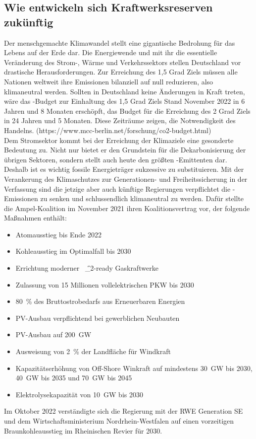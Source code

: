 	\subsection{Wie entwickeln sich Kraftwerksreserven zukünftig}	
	Der menschgemachte Klimawandel stellt eine gigantische Bedrohung für das Lebens auf der Erde dar. Die Energiewende und mit ihr die essentielle Veränderung des Strom-, Wärme und Verkehrssektors stellen Deutschland vor drastische Herausforderungen. Zur Erreichung des 1,5 Grad Ziels müssen alle Nationen weltweit ihre Emissionen bilanziell auf null reduzieren, also klimaneutral werden. Sollten in Deutschland keine Änderungen in Kraft treten, wäre das \SI{}{\COtwo}-Budget zur Einhaltung des 1,5 Grad Ziels Stand November 2022 in 6 Jahren und 8 Monaten erschöpft, das Budget für die Erreichung des 2 Grad Ziels in 24 Jahren und 5 Monaten. Diese Zeiträume zeigen, die Notwendigkeit des Handelns.  (https://www.mcc-berlin.net/forschung/co2-budget.html)\\
	
	Dem Stromsektor kommt bei der Erreichung der Klimaziele eine gesonderte Bedeutung zu. Nicht nur bietet er den Grundstein für die Dekarbonisierung der übrigen Sektoren, sondern stellt auch heute den größten \SI{}{\COtwo}-Emittenten dar. Deshalb ist es wichtig fossile Energieträger sukzessive zu substituieren. Mit der Verankerung des Klimaschutzes zur Generationen- und Freiheitssicherung in der Verfassung sind die jetzige aber auch künftige Regierungen verpflichtet die \SI{}{\COtwo}-Emissionen zu senken und schlussendlich klimaneutral zu werden. Dafür stellte die Ampel-Koalition im November 2021 ihren Koalitionsvertrag vor, der folgende Maßnahmen enthält:
		\begin{itemize}
			\item Atomausstieg bis Ende 2022
			\item Kohleausstieg im Optimalfall bis 2030
			\item Errichtung moderner \SI{}{\H{_2}}-ready Gaskraftwerke
			\item Zulassung von 15 Millionen vollelektrischen PKW bis 2030
			\item \SI{80}{\percent} des Bruttostrobedarfs aus Erneuerbaren Energien
			\item PV-Ausbau verpflichtend bei gewerblichen Neubauten
			\item PV-Ausbau auf \SI{200}{\giga \watt}
			\item Ausweisung von \SI{2}{\percent} der Landfläche für Windkraft
			\item Kapazitätserhöhung von Off-Shore Winkraft auf mindestens \SI{30}{\giga \watt} bis 2030, \SI{40}{\giga \watt} bis 2035 und \SI{70}{\giga \watt} bis 2045
			\item Elektrolysekapazität von \SI{10}{\giga \watt} bis 2030
		\end{itemize}
		Im Oktober 2022 verständigte sich die Regierung mit der RWE Generation SE und dem Wirtschaftsministerium Nordrhein-Westfalen auf einen vorzeitigen Braunkohleausstieg im Rheinischen Revier für 2030.\\
		
